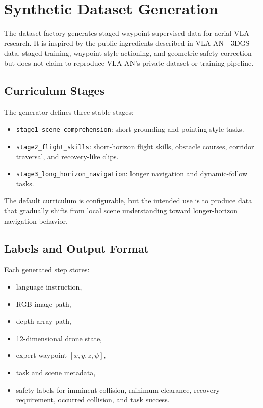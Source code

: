 \documentclass[11pt]{article}
\begin{document}
\section{Synthetic Dataset Generation}

The dataset factory generates staged waypoint-supervised data for aerial VLA research. It is inspired by the public ingredients described in VLA-AN---3DGS data, staged training, waypoint-style actioning, and geometric safety correction---but does not claim to reproduce VLA-AN's private dataset or training pipeline.

\subsection{Curriculum Stages}

The generator defines three stable stages:
\begin{itemize}[leftmargin=*]
    \item \texttt{stage1\_scene\_comprehension}: short grounding and pointing-style tasks.
    \item \texttt{stage2\_flight\_skills}: short-horizon flight skills, obstacle courses, corridor traversal, and recovery-like clips.
    \item \texttt{stage3\_long\_horizon\_navigation}: longer navigation and dynamic-follow tasks.
\end{itemize}

The default curriculum is configurable, but the intended use is to produce data that gradually shifts from local scene understanding toward longer-horizon navigation behavior.

\subsection{Labels and Output Format}

Each generated step stores:
\begin{itemize}[leftmargin=*]
    \item language instruction,
    \item RGB image path,
    \item depth array path,
    \item 12-dimensional drone state,
    \item expert waypoint $[x,y,z,\psi]$,
    \item task and scene metadata,
    \item safety labels for imminent collision, minimum clearance, recovery requirement, occurred collision, and task success.
\end{itemize}
\end{document}
